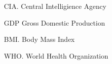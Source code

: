 \documentclass[oneside,12pt]{report}
\begin{document}
\noindent CIA. Central Intelligience Agency
\vspace{5pt}

\noindent GDP Gross Domestic Production

\vspace{5pt}

\noindent BMI. Body Mass Index

\vspace{5pt}

\noindent WHO. World Health Organization

\vspace{5pt}




\renewcommand\bibname{Selected Bibliography Including Cited Works}
\nocite{*}  %

\end{document}
